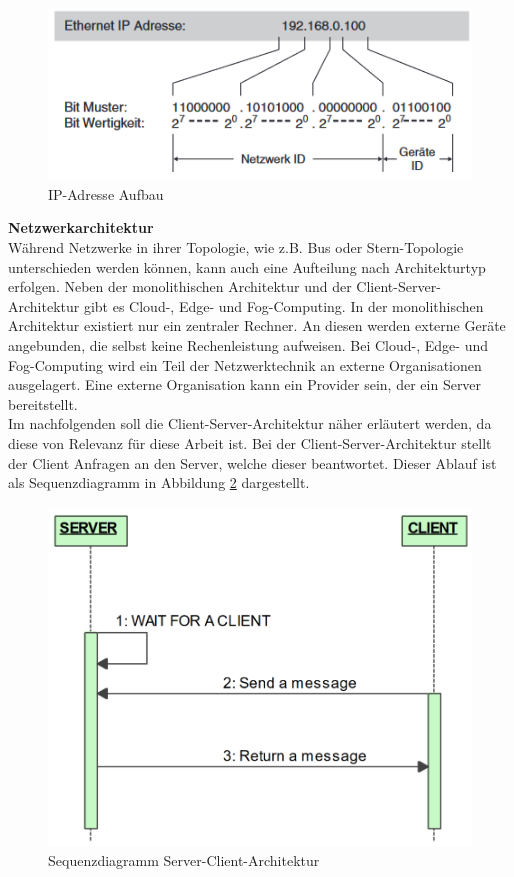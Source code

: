 \documentclass[ a4paper,
                oneside,
                toc=bibliography,
                toc=listof
                ]{scrbook}
\begin{document}
   	\begin{figure}[!ht]
   		\centering
   		\includegraphics[width=0.70\linewidth]{./images/IP Adresse Aufbau.png}
   		\caption{IP-Adresse Aufbau \cite{hering2012elektrotechnik}} 
   		\label{fig:IP-Adresse}
   	\end{figure}
   	\clearpage
   	\noindent
   	\textbf{Netzwerkarchitektur}\\
   	Während Netzwerke in ihrer Topologie, wie z.B. Bus oder Stern-Topologie unterschieden werden können, kann auch eine Aufteilung nach Architekturtyp erfolgen. Neben der monolithischen Architektur und der Client-Server-Architektur gibt es Cloud-, Edge- und Fog-Computing. In der monolithischen Architektur existiert nur ein zentraler Rechner. An diesen werden externe Geräte angebunden, die selbst keine Rechenleistung aufweisen. Bei Cloud-, Edge- und Fog-Computing wird ein Teil der Netzwerktechnik an externe Organisationen ausgelagert. Eine externe Organisation kann ein Provider sein, der ein Server bereitstellt. \\
   	Im nachfolgenden soll die Client-Server-Architektur näher erläutert werden, da diese von Relevanz für diese Arbeit ist.
   	Bei der Client-Server-Architektur stellt der Client Anfragen an den Server, welche dieser beantwortet. Dieser Ablauf ist als Sequenzdiagramm in Abbildung \ref{fig:Sequenz Server-Client} dargestellt.\\
   	\begin{figure}[!ht]
   		\centering
   		\includegraphics[width=0.50\linewidth]{./images/Sequenzdiagramm_Server_Client.png}
   		\caption{Sequenzdiagramm Server-Client-Architektur \cite{CS9_TCP}} 
   		\label{fig:Sequenz Server-Client}
   	\end{figure} \\   	
\end{document}
